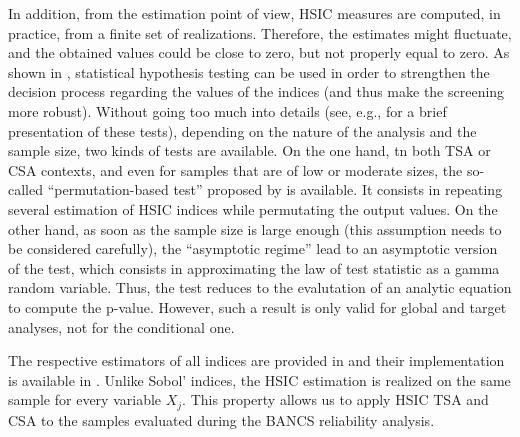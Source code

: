 In addition, from the estimation point of view, HSIC measures are computed, in practice, from a finite set of realizations. Therefore, the estimates might fluctuate, and the obtained values could be close to zero, but not properly equal to zero. As shown in \citet{delozzo_2016_hsic_test}, statistical hypothesis testing can be used in order to strengthen the decision process regarding the values of the indices (and thus make the screening more robust). Without going too much into details (see, e.g., \citet{chabridon_iooss_marrel_2020} for a brief presentation of these tests), depending on the nature of the analysis and the sample size, two kinds of tests are available. On the one hand, tn both TSA or CSA contexts, and even for samples that are of low or moderate sizes, the so-called ``permutation-based test'' proposed by \citet{delozzo_2016_hsic_test} is available. It consists in repeating several estimation of HSIC indices while permutating the output values. On the other hand, as soon as the sample size is large enough (this assumption needs to be considered carefully), the ``asymptotic regime'' lead to an asymptotic version of the test, which consists in approximating the law of test statistic as a gamma random variable. Thus, the test reduces to the evalutation of an analytic equation to compute the p-value. However, such a result is only valid for global and target analyses, not for the conditional one.

The respective estimators of all indices are provided in \citet{marrel_chabridon_2021} and their implementation is available in \ot.
Unlike Sobol' indices, the HSIC estimation is realized on the same sample for every variable $X_j$. 
This property allows us to apply HSIC TSA and CSA to the samples evaluated during the BANCS reliability analysis.



